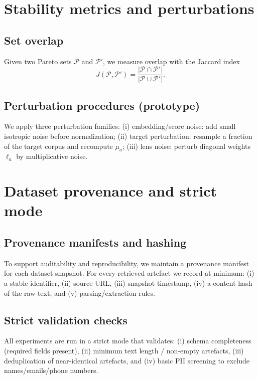\documentclass{article}
\begin{document}
\section{Stability metrics and perturbations}
\subsection{Set overlap}
Given two Pareto sets $\mathcal{P}$ and $\mathcal{P}'$, we measure overlap with the Jaccard index
\begin{equation}
  J(\mathcal{P},\mathcal{P}') = \frac{|\mathcal{P}\cap\mathcal{P}'|}{|\mathcal{P}\cup\mathcal{P}'|}.
\end{equation}

\subsection{Perturbation procedures (prototype)}
We apply three perturbation families:
(i) {embedding/score noise:} add small isotropic noise before normalization;
(ii) {target perturbation:} resample a fraction of the target corpus and recompute $\mu_a$;
(iii) {lens noise:} perturb diagonal weights $\ell_a$ by multiplicative noise.

\section{Dataset provenance and strict mode}
\subsection{Provenance manifests and hashing}
To support auditability and reproducibility, we maintain a provenance manifest for each dataset snapshot.
For every retrieved artefact we record at minimum:
(i) a stable identifier, (ii) source URL, (iii) snapshot timestamp, (iv) a content hash of the raw text, and (v) parsing/extraction rules.

\subsection{Strict validation checks}
All experiments are run in a strict mode that validates:
(i) schema completeness (required fields present),
(ii) minimum text length / non-empty artefacts,
(iii) deduplication of near-identical artefacts,
and (iv) basic PII screening to exclude names/emails/phone numbers.

\end{document}
